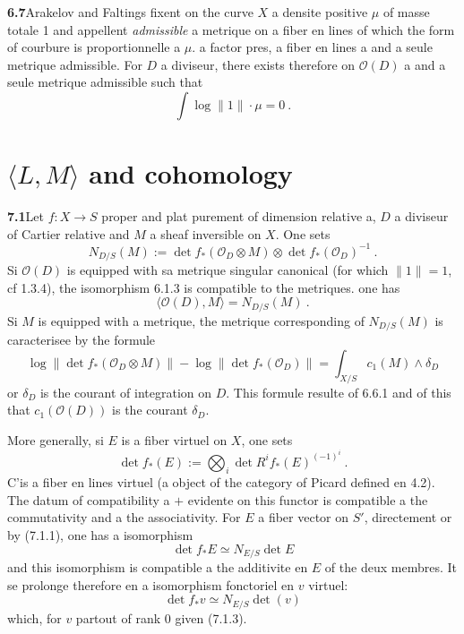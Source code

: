 \documentclass[12pt,a4paper]{article}
\theoremstyle{plain}
\theoremstyle{definition}
\theoremstyle{remark}
\newcommand{\calO}{\mathcal{O}}
\begin{document}
\medskip
\noindent\textbf{6.7}\quad Arakelov and Faltings fixent on the curve $X$ a densite positive $\mu$ of masse totale 1 and appellent \emph{admissible} a metrique on a fiber en lines of which the form of courbure is proportionnelle a $\mu$. a factor pres, a fiber en lines a and a seule metrique admissible. For $D$ a diviseur, there exists therefore on $\calO(D)$ a and a seule metrique admissible such that
\[
\int \log \|1\| \cdot \mu = 0 \ .
\]


\section{$\langle L, M \rangle$ and cohomology}

\noindent\textbf{7.1}\quad Let $f: X \to S$ proper and plat purement of dimension relative a, $D$ a diviseur of Cartier relative and $M$ a sheaf inversible on $X$. One sets
\begin{equation}
\label{eq:7.1.1}
N_{D/S}(M) := \det f_*(\calO_D \otimes M) \otimes \det f_*(\calO_D)^{-1} \ .
\end{equation}
Si $\calO(D)$ is equipped with sa metrique singular canonical (for which $\|1\| = 1$, cf 1.3.4), the isomorphism 6.1.3 is compatible to the metriques. one has
\begin{equation}
\label{eq:7.1.2}
\langle \calO(D), M \rangle = N_{D/S}(M) \ .
\end{equation}
Si $M$ is equipped with a metrique, the metrique corresponding of $N_{D/S}(M)$ is caracterisee by the formule
\begin{equation}
\label{eq:7.1.3}
\log \|\det f_*(\calO_D \otimes M)\| - \log \|\det f_*(\calO_D)\| = \int_{X/S} c_1(M) \wedge \delta_D
\end{equation}
or $\delta_D$ is the courant of integration on $D$. This formule resulte of 6.6.1 and of this that $c_1(\calO(D))$ is the courant $\delta_D$.

More generally, si $E$ is a fiber virtuel on $X$, one sets
\begin{equation}
\label{eq:7.1.4}
\det f_*(E) := \bigotimes_i \det R^i f_*(E)^{(-1)^i} \ .
\end{equation}
C'is a fiber en lines virtuel (a object of the category of Picard defined en 4.2). The datum of compatibility a $+$ evidente on this functor is compatible a the commutativity and a the associativity. For $E$ a fiber vector on $S'$, directement or by (7.1.1), one has a isomorphism
\[
\det f_* E \simeq N_{E/S} \det E
\]
and this isomorphism is compatible a the additivite en $E$ of the deux membres. It se prolonge therefore en a isomorphism fonctoriel en $v$ virtuel:
\begin{equation}
\label{eq:7.1.5}
\det f_* v \simeq N_{E/S} \det(v)
\end{equation}
which, for $v$ partout of rank 0 given (7.1.3).
\end{document}
